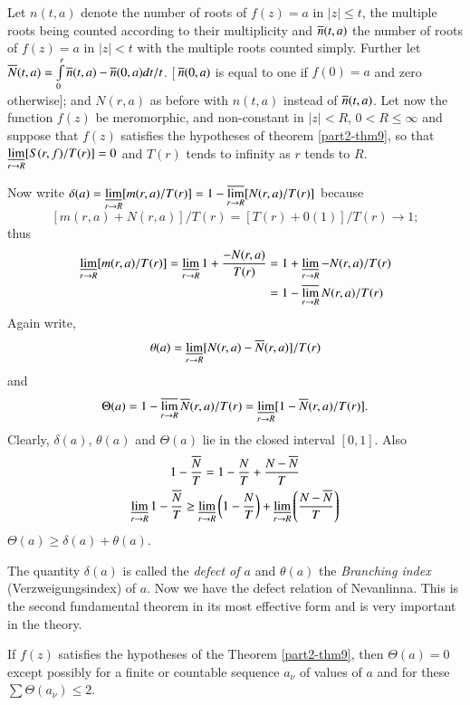 \begin{defi*}
Let $n(t,a)$ denote the number of roots of $f(z)=a$ in $|z|\leq t$,
the multiple roots being counted according to their multiplicity and
$\overline{n}(t,a)$ the number of roots of $f(z)=a$ in $|z|<t$ with the
multiple roots counted simply. Further let
$\overline{N}(t,a)=\int\limits^{r}_{0}\overline{n}(t,a)-\overline{n}(0,a)dt/t$. [\,$\overline{n}(0,a)$
  is equal to one if $f(0)=a$ and zero otherwise]; and $N(r,a)$
as before with $n(t,a)$ instead of $\overline{n}(t,a)$. Let now the function
$f(z)$ be meromorphic, and non-constant in $|z|<R$, $0<R\leq \infty$
and suppose that $f(z)$ satisfies the hypotheses of theorem
\ref{part2-thm9}, so that $\mathop{\underline{\lim}}\limits_{r\to
  R}[S(r,f)/T(r)]=0$ and $T(r)$ tends to infinity as $r$ tends to $R$.
\end{defi*}

Now write $\delta(a)=\mathop{\underline{\lim}}\limits_{r\to
  R}[m(r,a)/T(r)]=1-\mathop{\overline{\lim}}\limits_{r\to R}[N(r,a)/T(r)]$
because
$$
[m(r,a)+N(r,a)]/T(r)=[T(r)+0(1)]/T(r)\to 1;
$$
thus
\begin{align*}
\mathop{\underline{\lim}}\limits_{r\to
  R}[m(r,a)/T(r)]=\mathop{\underline{\lim}}\limits_{r\to
  R}1+\frac{-N(r,a)}{T(r)} &= 1+\mathop{\underline{\lim}}\limits_{r\to
  R}-N(r,a)/T(r)\\
&= 1-\mathop{\overline{\lim}}\limits_{r\to R}N(r,a)/T(r)
\end{align*}
Again write,
$$
\theta(a)=\mathop{\underline{\lim}}\limits_{r\to R}[N(r,a)-\overline{N}(r,a)]/T(r)
$$
and
$$
\Theta(a)=1-\mathop{\overline{\lim}}\limits_{r\to
  R}\overline{N}(r,a)/T(r)=\mathop{\underline{\lim}}\limits_{r\to
  R}[1-\overline{N}(r,a)/T(r)].
$$
Clearly, $\delta(a)$, $\theta(a)$ and $\Theta(a)$ lie in the closed
interval $[0,1]$. Also
\begin{gather*}
1-\frac{\overline{N}}{T}=1-\frac{N}{T}+\frac{N-\overline{N}}{T}\\
\mathop{\underline{\lim}}\limits_{r\to R} 1-\frac{\overline{N}}{T}\geq
\mathop{\underline{\lim}}\limits_{r\to
  R}\left(1-\frac{N}{T}\right)+\mathop{\underline{\lim}}\limits_{r\to R}\left(\frac{N-\overline{N}}{T}\right)
\end{gather*}\pageoriginale
\ie $\Theta(a)\geq \delta(a)+\theta(a)$.

The quantity $\delta(a)$ is called the {\em defect of $a$} and
$\theta(a)$ the {\em Branching index} (Verzweigungsindex) of $a$. Now
we have the defect relation of Nevanlinna. This is the second
fundamental theorem in its most effective form and is very important
in the theory.

\begin{thm}\label{part2-thm10}
If $f(z)$ satisfies the hypotheses of the Theorem \ref{part2-thm9},
then $\Theta(a)=0$ except possibly for a finite or countable sequence
$a_{\nu}$ of values of $a$ and for these $\sum \Theta(a_{\nu})\leq 2$.
\end{thm}

